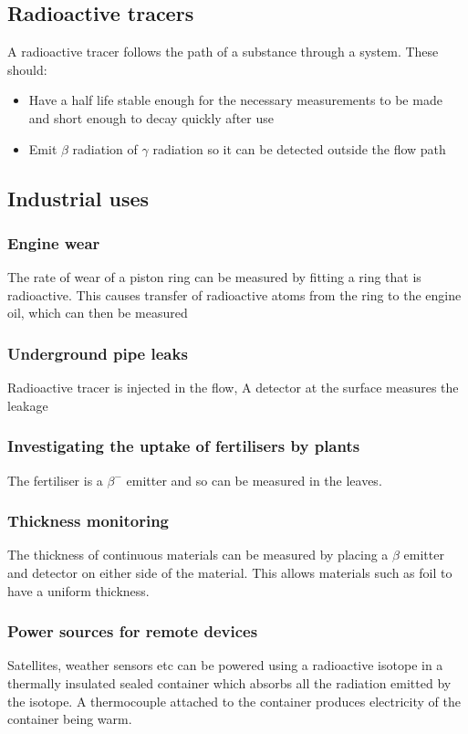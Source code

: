 \documentclass{article}[18pt]
\begin{document}
\subsection{Radioactive tracers}
A radioactive tracer follows the path of a substance through a system. These should:
\begin{itemize}
\item Have a half life stable enough for the necessary measurements to be made and short enough to decay quickly after use
\item Emit $\beta$ radiation of $\gamma$ radiation so it can be detected outside the flow path
\end{itemize}
\subsection{Industrial uses}
\subsubsection{Engine wear}
The rate of wear of a piston ring can be measured by fitting a ring that is radioactive. This causes transfer of radioactive atoms from the ring to the engine oil, which can then be measured
\subsubsection{Underground pipe leaks}
Radioactive tracer is injected in the flow, A detector at the surface measures the leakage
\subsubsection{Investigating the uptake of fertilisers by plants}
The fertiliser is a $\beta^-$ emitter and so can be measured in the leaves.
\subsubsection{Thickness monitoring}
The thickness of continuous materials can be measured by placing a $\beta$ emitter and detector on either side of the material. This allows materials such as foil to have a uniform thickness.
\subsubsection{Power sources for remote devices}
Satellites, weather sensors etc can be powered using a radioactive isotope in a thermally insulated sealed container which absorbs all the radiation emitted by the isotope. A thermocouple attached to the container produces electricity of the container being warm.
\end{document}
